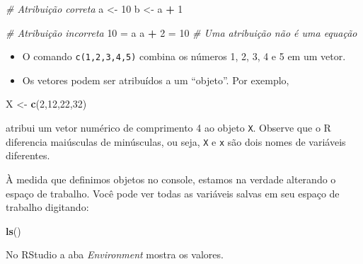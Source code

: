 \documentclass[
]{book}
\newenvironment{Shaded}{\begin{snugshade}}{\end{snugshade}}
\newcommand{\CommentTok}[1]{\textcolor[rgb]{0.56,0.35,0.01}{\textit{#1}}}
\newcommand{\DecValTok}[1]{\textcolor[rgb]{0.00,0.00,0.81}{#1}}
\newcommand{\FunctionTok}[1]{\textcolor[rgb]{0.13,0.29,0.53}{\textbf{#1}}}
\newcommand{\NormalTok}[1]{#1}
\newcommand{\OtherTok}[1]{\textcolor[rgb]{0.56,0.35,0.01}{#1}}
\newcommand{\SpecialCharTok}[1]{\textcolor[rgb]{0.81,0.36,0.00}{\textbf{#1}}}
\begin{document}
\begin{Shaded}
\begin{Highlighting}[]
\CommentTok{\# Atribuição correta }
\NormalTok{a }\OtherTok{\textless{}{-}} \DecValTok{10}
\NormalTok{b }\OtherTok{\textless{}{-}}\NormalTok{ a }\SpecialCharTok{+} \DecValTok{1}
\end{Highlighting}
\end{Shaded}

\begin{Shaded}
\begin{Highlighting}[]
\CommentTok{\# Atribuição incorreta}
\DecValTok{10} \OtherTok{=}\NormalTok{ a}
\NormalTok{a }\SpecialCharTok{+} \DecValTok{2} \OtherTok{=} \DecValTok{10} \CommentTok{\# Uma atribuição não é uma equação}
\end{Highlighting}
\end{Shaded}

\begin{itemize}
\item
  O comando \texttt{c(1,2,3,4,5)} combina os números 1, 2, 3, 4 e 5 em um vetor.
\item
  Os vetores podem ser atribuídos a um ``objeto''. Por exemplo,
\end{itemize}

\begin{Shaded}
\begin{Highlighting}[]
\NormalTok{X }\OtherTok{\textless{}{-}} \FunctionTok{c}\NormalTok{(}\DecValTok{2}\NormalTok{,}\DecValTok{12}\NormalTok{,}\DecValTok{22}\NormalTok{,}\DecValTok{32}\NormalTok{)}
\end{Highlighting}
\end{Shaded}

atribui um vetor numérico de comprimento 4 ao objeto \texttt{X}. Observe que o R diferencia maiúsculas de minúsculas, ou seja, \texttt{X} e \texttt{x} são dois nomes de variáveis diferentes.

À medida que definimos objetos no console, estamos na verdade alterando o espaço de trabalho. Você pode ver todas as variáveis salvas em seu espaço de trabalho digitando:

\begin{Shaded}
\begin{Highlighting}[]
\FunctionTok{ls}\NormalTok{()}
\end{Highlighting}
\end{Shaded}

No RStudio a aba \emph{Environment} mostra os valores.
\end{document}
